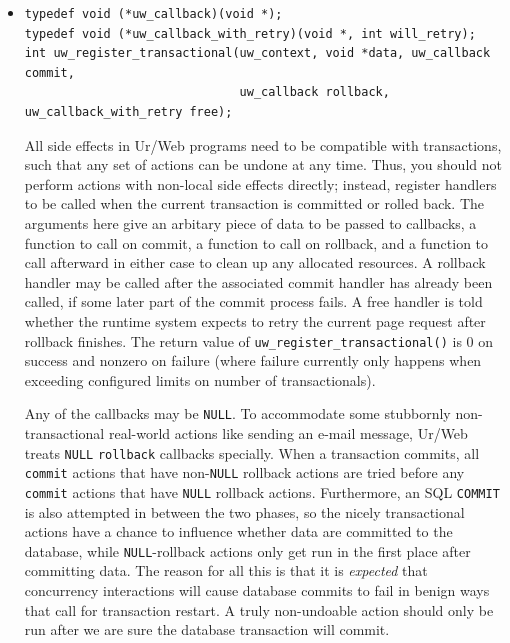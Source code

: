 \documentclass{article}
\begin{document}
\begin{itemize}
  For performance and correctness reasons, it is usually preferable to use \texttt{uw\_malloc()} instead of \texttt{malloc()}.  The former manipulates a local heap that can be kept allocated across page requests, while the latter uses global data structures that may face contention during concurrent execution.  However, we emphasize again that \texttt{uw\_malloc()} should never be used to implement some logic that couldn't be implemented trivially by a constant-valued expression in Ur.

  \item \begin{verbatim}
typedef void (*uw_callback)(void *);
typedef void (*uw_callback_with_retry)(void *, int will_retry);
int uw_register_transactional(uw_context, void *data, uw_callback commit,
                              uw_callback rollback, uw_callback_with_retry free);
  \end{verbatim}
  All side effects in Ur/Web programs need to be compatible with transactions, such that any set of actions can be undone at any time.  Thus, you should not perform actions with non-local side effects directly; instead, register handlers to be called when the current transaction is committed or rolled back.  The arguments here give an arbitary piece of data to be passed to callbacks, a function to call on commit, a function to call on rollback, and a function to call afterward in either case to clean up any allocated resources.  A rollback handler may be called after the associated commit handler has already been called, if some later part of the commit process fails.  A free handler is told whether the runtime system expects to retry the current page request after rollback finishes.  The return value of \texttt{uw\_register\_transactional()} is 0 on success and nonzero on failure (where failure currently only happens when exceeding configured limits on number of transactionals).

  Any of the callbacks may be \texttt{NULL}.  To accommodate some stubbornly non-transactional real-world actions like sending an e-mail message, Ur/Web treats \texttt{NULL} \texttt{rollback} callbacks specially.  When a transaction commits, all \texttt{commit} actions that have non-\texttt{NULL} rollback actions are tried before any \texttt{commit} actions that have \texttt{NULL} rollback actions.  Furthermore, an SQL \texttt{COMMIT} is also attempted in between the two phases, so the nicely transactional actions have a chance to influence whether data are committed to the database, while \texttt{NULL}-rollback actions only get run in the first place after committing data.  The reason for all this is that it is \emph{expected} that concurrency interactions will cause database commits to fail in benign ways that call for transaction restart.  A truly non-undoable action should only be run after we are sure the database transaction will commit.


\end{itemize}
\end{document}
